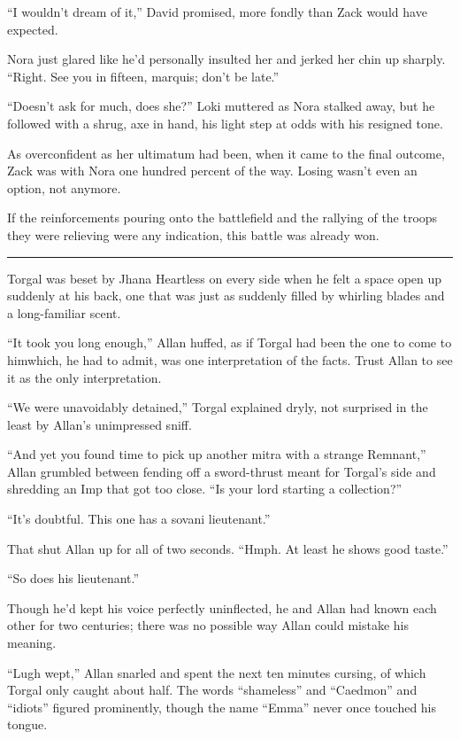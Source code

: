 ``I wouldn't dream of it,'' David promised, more fondly than Zack would have expected.

Nora just glared like he'd personally insulted her and jerked her chin up sharply. ``Right. See you in fifteen, marquis; don't be late.''

``Doesn't ask for much, does she?'' Loki muttered as Nora stalked away, but he followed with a shrug, axe in hand, his light step at odds with his resigned tone.

As overconfident as her ultimatum had been, when it came to the final outcome, Zack was with Nora one hundred percent of the way. Losing wasn't even an option, not anymore.

If the reinforcements pouring onto the battlefield and the rallying of the troops they were relieving were any indication, this battle was already won.

\fancybreak{\pfbreakdisplay}


Torgal was beset by Jhana Heartless on every side when he felt a space open up suddenly at his back, one that was just as suddenly filled by whirling blades and a long-familiar scent.

``It took you long enough,'' Allan huffed, as if Torgal had been the one to come to him\textemdash which, he had to admit, was one interpretation of the facts. Trust Allan to see it as the only interpretation.

``We were unavoidably detained,'' Torgal explained dryly, not surprised in the least by Allan's unimpressed sniff.

``And yet you found time to pick up another mitra with a strange Remnant,'' Allan grumbled between fending off a sword-thrust meant for Torgal's side and shredding an Imp that got too close. ``Is your lord starting a collection?''

``It's doubtful. This one has a sovani lieutenant.''

That shut Allan up for all of two seconds. ``Hmph. At least he shows good taste.''

``So does his lieutenant.''

Though he'd kept his voice perfectly uninflected, he and Allan had known each other for two centuries; there was no possible way Allan could mistake his meaning.

``Lugh wept,'' Allan snarled and spent the next ten minutes cursing, of which Torgal only caught about half. The words ``shameless'' and ``Caedmon'' and ``idiots'' figured prominently, though the name ``Emma'' never once touched his tongue.

